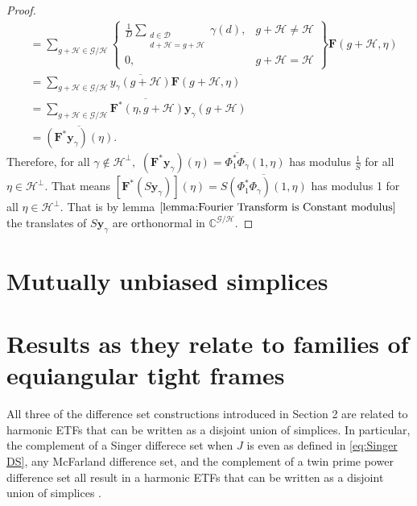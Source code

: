 \documentclass[3p,11pt]{elsarticle}
\newcommand{\bbC}{\mathbb{C}}
\newcommand{\bfF}{\mathbf{F}}
\newcommand{\bfy}{\mathbf{y}}
\newcommand{\calD}{\mathcal{D}}
\newcommand{\calG}{\mathcal{G}}
\newcommand{\calH}{\mathcal{H}}
\theoremstyle{definition}
\begin{document}
\begin{proof}
\begin{align*}
&=\sum_{g+\calH\in\calG/\calH}\left\{\begin{array}{cl}
\frac{1}{D}\sum_{\substack{d\in\calD\\d+\calH=g+\calH}}\gamma(d), & g+\calH\not=\calH\\ 
0, & g+\calH=\calH
\end{array}\right\}\bfF(g+\calH,\eta)\\
&=\sum_{g+\calH\in\calG/\calH}\overline{y_\gamma(g+\calH)}\bfF(g+\calH,\eta)\\
&=\overline{\sum_{g+\calH\in\calG/\calH}\bfF^*(\eta,g+\calH)\bfy_\gamma(g+\calH)}\\
&=\overline{(\bfF^*\bfy_\gamma)(\eta)}.
\end{align*}
Therefore, for all $\gamma\not\in\calH^\perp,$ $(\bfF^*\bfy_\gamma)(\eta)=\overline{\Phi_1^*\Phi_\gamma}(1,\eta)$ has modulus $\frac{1}{S}$ for all $\eta\in\calH^\perp.$ That means $[\bfF^*(S\bfy_\gamma)](\eta)=\overline{S(\Phi_1^*\Phi_\gamma)(1,\eta)}$ has modulus 1 for all $\eta\in\calH^\perp.$ That is by lemma $\ref{lemma:Fourier Transform is Constant modulus}$ the translates of $S\bfy_\gamma$ are orthonormal in $\bbC^{\calG/\calH}.$
\end{proof}
\section{Mutually unbiased simplices}



\section{Results as they relate to families of equiangular tight frames}

All three of the difference set constructions introduced in Section 2 are related to harmonic ETFs that can be written as a disjoint union of simplices. In particular, the complement of a Singer differece set when $J$ is even as defined in \eqref{eq:Singer DS}, any McFarland difference set, and the complement of a twin prime power difference set all result in a harmonic ETFs that can be written as a disjoint union of simplices \cite{FickusJKM18}.
\end{document}

